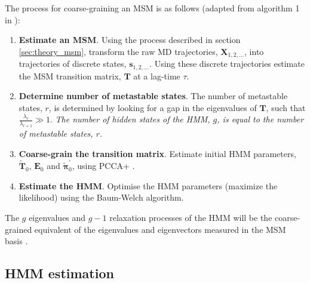 The process for coarse-graining an MSM is as follows (adapted from algorithm 1 in \cite{noeProjectedHiddenMarkov2013a}): 
\begin{enumerate}
    \item \textbf{Estimate an MSM}. Using the process described in section \ref{sec:theory_msm}, transform the raw MD trajectories, $\mathbf{X}_{1,2,\ldots}$, into trajectories of discrete states, $\mathbf{s}_{1, 2, \ldots}$. Using these discrete trajectories estimate the MSM transition matrix, $\mathbf{T}$ at a lag-time $\tau$. 
    \item \textbf{Determine number of metastable states}. The number of metastable states, $r$, is determined by looking for a gap in the eigenvalues of $\mathbf{T}$, such that  $\frac{\lambda_{r}}{\lambda_{r+1}} \gg 1$. \emph{The number of hidden states of the HMM, $g$, is equal to the number of metastable states, $r$}. 
    \item \textbf{Coarse-grain the transition matrix}. Estimate initial HMM parameters, $\widetilde{\mathbf{T}}_{0}$,  $\mathbf{E}_{0}$ and $\widetilde{\bm{\pi}}^{\prime}_{0}$, using PCCA+ \cite{deuflhardRobustPerronCluster2005b}. 
    \item \textbf{Estimate the HMM}. Optimise the HMM parameters (maximize the likelihood) using the Baum-Welch  \cite{baumMaximizationTechniqueOccurring1970} \cite{welch2003hidden} algorithm. 
\end{enumerate}
The $g$ eigenvalues and $g-1$ relaxation processes of the HMM will be the coarse-grained equivalent of the  eigenvalues and eigenvectors measured in the MSM basis \cite{noeProjectedHiddenMarkov2013a}. 

\subsection{HMM estimation}


